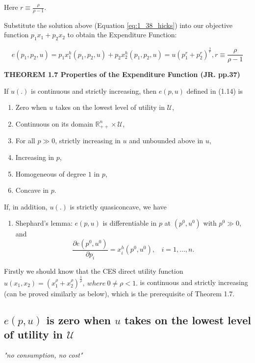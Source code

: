 \documentclass{article}
\newcommand{\R}{\mathbb{R}}
\begin{document}
\begin{mdframed}[backgroundcolor=blue!20,linecolor=white]
Here $r \equiv \frac{\rho}{\rho - 1}$.

Substitute the solution above (Equation \ref{eq:1_38_hicks}) into our
objective function  $p_1x_1 + p_2x_2$ to obtain the Expenditure Function:

$$e(p_1,p_2, u) = p_1x_1^h(p_1,p_2,u) + p_2x_2^h(p_1,p_2,u) = 
u(p_1^{r} + p_2^{r})^{\frac{1}{r}} , r \equiv \frac{\rho}{\rho - 1}$$

\textbf{THEOREM 1.7 Properties of the Expenditure Function (JR. pp.37)}

\medskip

If $u(.)$ is continuous and strictly increasing, then $e(p, u)$ defined in (1.14) is

\begin{enumerate}
\item Zero when $u$ takes on the lowest level of utility in $\mathcal{U}$,
\item Continuous on its domain $\R^n_{++} \times \mathcal{U}$,
\item For all $p \gg 0$, strictly increasing in $u$ and unbounded above in $u$,
\item Increasing in $p$,
\item Homogeneous of degree $1$ in $p$,
\item Concave in $p$.
\end{enumerate}
If, in addition, $u(.)$ is strictly quasiconcave, we have
\begin{enumerate}[start = 7]
\item Shephard’s lemma: $e(p, u)$ is differentiable in $p$ at $(p^0, u^0)$ with $p^0 \gg 0$, and
$$\frac{\partial e(p^0, u^0)}{\partial p_i} = x^h_i (p^0, u^0), \ \ \ \ i = 1, . . . , n.$$
\end{enumerate}
\end{mdframed}

Firstly we should know that the CES direct utility function $u(x_1, x_2) = (x_1^{\rho} + x_2^{\rho})^{\frac{1}{\rho}},\ where \ 0 \ne \rho<1.$ is continuous and strictly increasing (can be proved similarly as below), which is the
prerequisite of Theorem 1.7.

\subsection{$e(p, u)$ is zero when $u$ takes on the lowest level of utility in $\mathcal{U}$}
\begin{mdframed}[backgroundcolor=blue!20,linecolor=white]
\textit{"no consumption, no cost"}

\end{mdframed}
\end{document}
